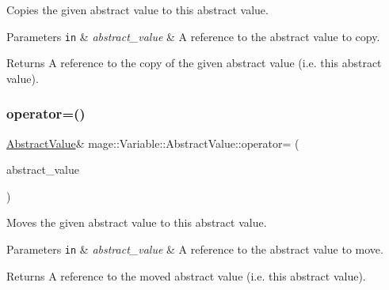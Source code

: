 Copies the given abstract value to this abstract value.


\begin{DoxyParams}[1]{Parameters}
\mbox{\tt in}  & {\em abstract\+\_\+value} & A reference to the abstract value to copy. \\
\hline
\end{DoxyParams}
\begin{DoxyReturn}{Returns}
A reference to the copy of the given abstract value (i.\+e. this abstract value). 
\end{DoxyReturn}
\hypertarget{structmage_1_1_variable_1_1_abstract_value_a4aac7aa9278054361c478b4b8a457e6e}{}\label{structmage_1_1_variable_1_1_abstract_value_a4aac7aa9278054361c478b4b8a457e6e} 
\subsubsection{\texorpdfstring{operator=()}{operator=()}\hspace{0.1cm}{\footnotesize\ttfamily [2/2]}}
{\footnotesize\ttfamily \hyperlink{structmage_1_1_variable_1_1_abstract_value}{Abstract\+Value}\& mage\+::\+Variable\+::\+Abstract\+Value\+::operator= (\begin{DoxyParamCaption}\item[{\hyperlink{structmage_1_1_variable_1_1_abstract_value}{Abstract\+Value} \&\&}]{abstract\+\_\+value }\end{DoxyParamCaption})\hspace{0.3cm}{\ttfamily [delete]}}

Moves the given abstract value to this abstract value.


\begin{DoxyParams}[1]{Parameters}
\mbox{\tt in}  & {\em abstract\+\_\+value} & A reference to the abstract value to move. \\
\hline
\end{DoxyParams}
\begin{DoxyReturn}{Returns}
A reference to the moved abstract value (i.\+e. this abstract value). 
\end{DoxyReturn}
